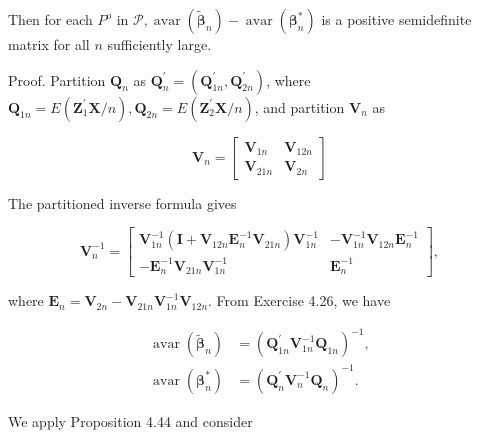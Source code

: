 \documentclass[10pt]{article}
\begin{document}
Then for each $P^{o}$ in $\mathcal{P}, \operatorname{avar}\left(\tilde{\boldsymbol{\beta}}_{n}\right)-\operatorname{avar}\left(\boldsymbol{\beta}_{n}^{*}\right)$ is a positive semidefinite matrix for all $n$ sufficiently large.

Proof. Partition $\mathbf{Q}_{n}$ as $\mathbf{Q}_{n}^{\prime}=\left(\mathbf{Q}_{1 n}^{\prime}, \mathbf{Q}_{2 n}^{\prime}\right)$, where $\mathbf{Q}_{1 n}=E\left(\mathbf{Z}_{1}^{\prime} \mathbf{X} / n\right), \mathbf{Q}_{2 n}= E\left(\mathbf{Z}_{2}^{\prime} \mathbf{X} / n\right)$, and partition $\mathbf{V}_{n}$ as

$$
\mathbf{V}_{n}=\left[\begin{array}{cc}
\mathbf{V}_{1 n} & \mathbf{V}_{12 n} \\
\mathbf{V}_{21 n} & \mathbf{V}_{2 n}
\end{array}\right]
$$

The partitioned inverse formula gives

$$
\mathbf{V}_{n}^{-1}=\left[\begin{array}{cc}
\mathbf{V}_{1 n}^{-1}\left(\mathbf{I}+\mathbf{V}_{12 n} \mathbf{E}_{n}^{-1} \mathbf{V}_{21 n}\right) \mathbf{V}_{1 n}^{-1} & -\mathbf{V}_{1 n}^{-1} \mathbf{V}_{12 n} \mathbf{E}_{n}^{-1} \\
-\mathbf{E}_{n}^{-1} \mathbf{V}_{21 n} \mathbf{V}_{1 n}^{-1} & \mathbf{E}_{n}^{-1}
\end{array}\right],
$$

where $\mathbf{E}_{n}=\mathbf{V}_{2 n}-\mathbf{V}_{21 n} \mathbf{V}_{1 n}^{-1} \mathbf{V}_{12 n}$. From Exercise 4.26, we have

$$
\begin{aligned}
\operatorname{avar}\left(\tilde{\boldsymbol{\beta}}_{n}\right) & =\left(\mathbf{Q}_{1 n}^{\prime} \mathbf{V}_{1 n}^{-1} \mathbf{Q}_{1 n}\right)^{-1}, \\
\operatorname{avar}\left(\boldsymbol{\beta}_{n}^{*}\right) & =\left(\mathbf{Q}_{n}^{\prime} \mathbf{V}_{n}^{-1} \mathbf{Q}_{n}\right)^{-1} .
\end{aligned}
$$

We apply Proposition 4.44 and consider
\end{document}
